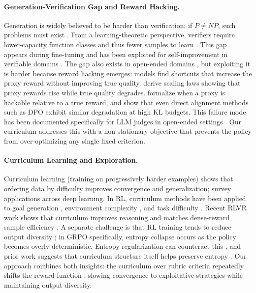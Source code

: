 \documentclass{article}
\theoremstyle{plain}
\theoremstyle{definition}
\theoremstyle{remark}
\begin{document}
\paragraph{Generation-Verification Gap and Reward Hacking.}
Generation is widely believed to be harder than verification; if $P \neq NP$, such problems must exist \citep{hartmanis1993godel, cook2023complexity}. From a learning-theoretic perspective, verifiers require lower-capacity function classes and thus fewer samples to learn \citep{vapnik2015uniform}. This gap appears during fine-tuning \citep{swamy2025all} and has been exploited for self-improvement in verifiable domains \citep{song2025mindgapexaminingselfimprovement}. The gap also exists in open-ended domains \citep{baer2014gold}, but exploiting it is harder because reward hacking emerges: models find shortcuts that increase the proxy reward without improving true quality. \citet{gao2023scaling} derive scaling laws showing that proxy rewards rise while true quality degrades. \citet{skalse2022defining} formalize when a proxy is hackable relative to a true reward, and \citet{rafailov2024scaling} show that even direct alignment methods such as DPO exhibit similar degradation at high KL budgets. This failure mode has been documented specifically for LLM judges in open-ended settings \citep{pan2024spontaneousrewardhackingiterative, wolf2025rewardmodeloveroptimisationiterated, zhao2025tokenfoolllmasajudge}. Our curriculum addresses this with a non-stationary objective that prevents the policy from over-optimizing any single fixed criterion.

\paragraph{Curriculum Learning and Exploration.}
Curriculum learning (training on progressively harder examples)  \citet{bengio2009curriculum} shows that ordering data by difficulty improves convergence and generalization; \citet{soviany2022curriculum} survey applications across deep learning. In RL, curriculum methods have been applied to goal generation \citep{florensa2017reverse}, environment complexity \citep{openai2019solving}, and task difficulty \citep{narvekar2020curriculum}. Recent RLVR work shows that curriculum improves reasoning \citep{parashar2025curriculumreinforcementlearningeasy} and matches dense-reward sample efficiency \citep{h1paper}. A separate challenge is that RL training tends to reduce output diversity \citep{kirk2024understanding, yu2025dapo}; in GRPO specifically, entropy collapse occurs as the policy becomes overly deterministic. Entropy regularization can counteract this \citep{ahmed2019understanding, simoni2025gtpostabilizinggrouprelative, tuyls2025representationbasedexplorationlanguagemodels}, and prior work suggests that curriculum structure itself helps preserve entropy \citep{bengio2009curriculum, cao2026efficientreinforcementlearningsemantic, setlur2025e3learningexploreenables}. Our approach combines both insights: the curriculum over rubric criteria repeatedly shifts the reward function \citep{zhou2022continuouslydiscoveringnovelstrategies}, slowing convergence to exploitative strategies while maintaining output diversity.
\end{document}

